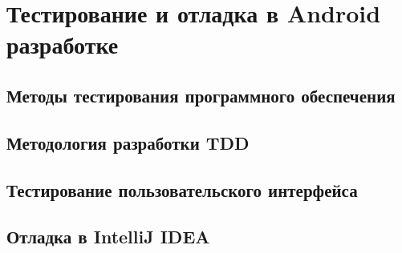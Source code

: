 \section{Тестирование и отладка в Android разработке}
\label{sec:testing}

\subsection{Методы тестирования программного обеспечения}
\label{subsec:testing:methods}

\subsection{Методология разработки TDD}
\label{subsec:testing:tdd}

\subsection{Тестирование пользовательского интерфейса}
\label{subsec:testing:ui}

\subsection{Отладка в IntelliJ IDEA}
\label{subsec:debug}

\conclusions
\label{sec:techConclusions}
